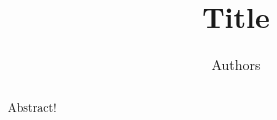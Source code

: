 \documentclass{article}
\title{Title}
\author{Authors}
\theoremstyle{plain}
\theoremstyle{definition}
\begin{document}
\maketitle

\begin{abstract}
    Abstract!
\end{abstract}



\clearpage



\end{document}
